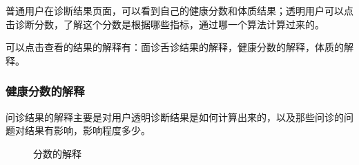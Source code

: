 普通用户在诊断结果页面，可以看到自己的健康分数和体质结果；透明用户可以点击诊断分数，了解这个分数是根据哪些指标，通过哪一个算法计算过来的。

可以点击查看的结果的解释有：面诊舌诊结果的解释，健康分数的解释，体质的解释。
 

\subsubsection{健康分数的解释}
问诊结果的解释主要是对用户透明诊断结果是如何计算出来的，以及那些问诊的问题对结果有影响，影响程度多少。

\begin{figure}[h]
    \centering
    \caption{分数的解释}
    \label{fig:report_expalin_score}
\end{figure}

